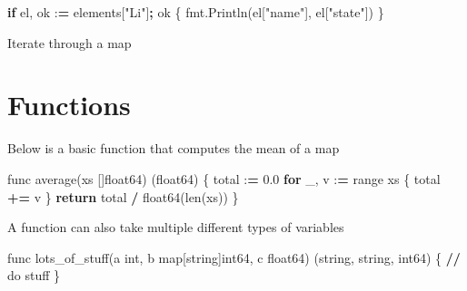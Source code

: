 \documentclass[]{book}
\newenvironment{Shaded}{\begin{snugshade}}{\end{snugshade}}
\newcommand{\FloatTok}[1]{\textcolor[rgb]{0.00,0.00,0.81}{#1}}
\newcommand{\CharTok}[1]{\textcolor[rgb]{0.31,0.60,0.02}{#1}}
\newcommand{\SpecialCharTok}[1]{\textcolor[rgb]{0.00,0.00,0.00}{#1}}
\newcommand{\StringTok}[1]{\textcolor[rgb]{0.31,0.60,0.02}{#1}}
\newcommand{\ControlFlowTok}[1]{\textcolor[rgb]{0.13,0.29,0.53}{\textbf{#1}}}
\newcommand{\OperatorTok}[1]{\textcolor[rgb]{0.81,0.36,0.00}{\textbf{#1}}}
\newcommand{\BuiltInTok}[1]{#1}
\newcommand{\NormalTok}[1]{#1}
\begin{document}
\begin{Shaded}
\begin{Highlighting}[]
\ControlFlowTok{if}\NormalTok{ el, ok :}\OperatorTok{=}\NormalTok{ elements[}\StringTok{"Li"}\NormalTok{]}\OperatorTok{;}\NormalTok{ ok \{}
\NormalTok{fmt.Println(el[}\StringTok{"name"}\NormalTok{], el[}\StringTok{"state"}\NormalTok{])}
\NormalTok{\}}
\end{Highlighting}
\end{Shaded}

Iterate through a map

\begin{Shaded}
\end{Shaded}

\section{Functions}\label{functions}

Below is a basic function that computes the mean of a map

\begin{Shaded}
\begin{Highlighting}[]
\NormalTok{func average(xs []float64) (float64) \{}
\NormalTok{    total :}\OperatorTok{=} \FloatTok{0.0}                      
    \ControlFlowTok{for}\NormalTok{ _, v :}\OperatorTok{=} \BuiltInTok{range}\NormalTok{ xs \{            }
\NormalTok{        total }\OperatorTok{+=}\NormalTok{ v                    }
\NormalTok{    \}}
    \ControlFlowTok{return}\NormalTok{ total }\OperatorTok{/}\NormalTok{ float64(}\BuiltInTok{len}\NormalTok{(xs))   }
\NormalTok{\}                                     }
\end{Highlighting}
\end{Shaded}

A function can also take multiple different types of variables

\begin{Shaded}
\begin{Highlighting}[]
\NormalTok{func lots_of_stuff(a }\BuiltInTok{int}\NormalTok{, b }\BuiltInTok{map}\NormalTok{[string]int64, c float64) (string, string, int64) \{}
\OperatorTok{//}\NormalTok{ do stuff}
\NormalTok{\}}
\end{Highlighting}
\end{Shaded}
\end{document}
